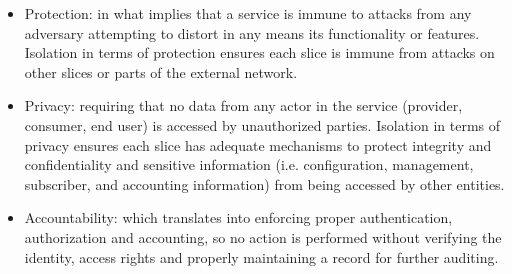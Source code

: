     \begin{itemize}
        \item Protection: in what implies that a service is immune to attacks from any adversary attempting to distort in any means its functionality or features. Isolation in terms of protection ensures each slice is immune from attacks on other slices or parts of the external network.
        
        \item Privacy: requiring that no data from any actor in the service (provider, consumer, end user) is accessed by unauthorized parties. Isolation in terms of privacy ensures each slice has adequate mechanisms to protect integrity and confidentiality and sensitive information (i.e. configuration, management, subscriber, and accounting information) from being accessed by other entities.
        
        \item Accountability: which translates into enforcing proper authentication, authorization and accounting, so no action is performed without verifying the identity, access rights and properly maintaining a record for further auditing.
    \end{itemize}
